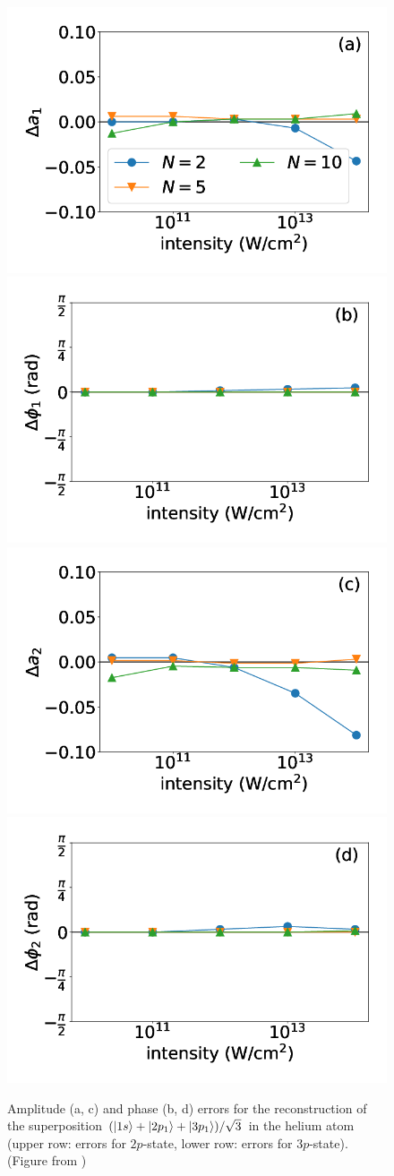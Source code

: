 \begin{figure}[!ht]
\centering
\includegraphics[width=0.48\linewidth]{figs/Photo_ionization/superpositions/Venzke_new_fig_10a.png}
\includegraphics[width=0.48\linewidth]{figs/Photo_ionization/superpositions/Venzke_new_fig_10b.png}\\
\includegraphics[width=0.48\linewidth]{figs/Photo_ionization/superpositions/Venzke_new_fig_10c.png}
\includegraphics[width=0.48\linewidth]{figs/Photo_ionization/superpositions/Venzke_new_fig_10d.png}

\caption{
Amplitude (a, c) and phase (b, d) errors for the reconstruction of the superposition $(\ket{1s}+\ket{2p_1}+\ket{3p_1})/\sqrt{3}$ in the helium atom (upper row: errors for $2p$-state, lower row: errors for $3p$-state).  (Figure from \cite{venzke2021_wave})
} 
  \label{fig:3-state}
\end{figure}

